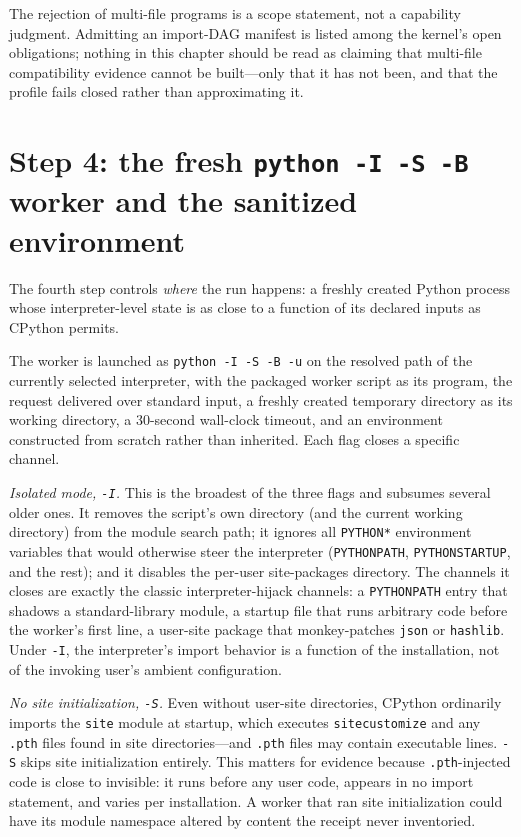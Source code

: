 \begin{boundary}\label{ch07:bd:multifile}
The rejection of multi-file programs is a scope statement, not a capability judgment. Admitting an import-DAG manifest is listed among the kernel's open obligations; nothing in this chapter should be read as claiming that multi-file compatibility evidence cannot be built---only that it has not been, and that the profile fails closed rather than approximating it.
\end{boundary}

\section{Step 4: the fresh \texttt{python -I -S -B} worker and the sanitized environment}\label{ch07:step4}

The fourth step controls \emph{where} the run happens: a freshly created Python process whose interpreter-level state is as close to a function of its declared inputs as CPython permits.

The worker is launched as \texttt{python -I -S -B -u} on the resolved path of the currently selected interpreter, with the packaged worker script as its program, the request delivered over standard input, a freshly created temporary directory as its working directory, a 30-second wall-clock timeout, and an environment constructed from scratch rather than inherited. Each flag closes a specific channel.

\emph{Isolated mode, \texttt{-I}.} This is the broadest of the three flags and subsumes several older ones. It removes the script's own directory (and the current working directory) from the module search path; it ignores all \texttt{PYTHON*} environment variables that would otherwise steer the interpreter (\texttt{PYTHONPATH}, \texttt{PYTHONSTARTUP}, and the rest); and it disables the per-user site-packages directory. The channels it closes are exactly the classic interpreter-hijack channels: a \texttt{PYTHONPATH} entry that shadows a standard-library module, a startup file that runs arbitrary code before the worker's first line, a user-site package that monkey-patches \texttt{json} or \texttt{hashlib}. Under \texttt{-I}, the interpreter's import behavior is a function of the installation, not of the invoking user's ambient configuration.

\emph{No site initialization, \texttt{-S}.} Even without user-site directories, CPython ordinarily imports the \texttt{site} module at startup, which executes \texttt{sitecustomize} and any \texttt{.pth} files found in site directories---and \texttt{.pth} files may contain executable lines. \texttt{-S} skips site initialization entirely. This matters for evidence because \texttt{.pth}-injected code is close to invisible: it runs before any user code, appears in no import statement, and varies per installation. A worker that ran site initialization could have its module namespace altered by content the receipt never inventoried.

